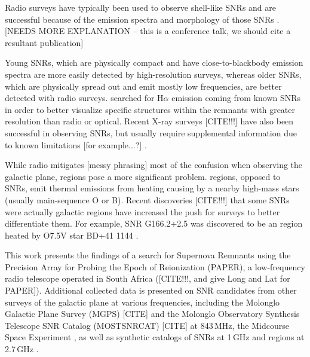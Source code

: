 \documentclass[preprint2,epsf,epsfig,graphics]{emulateapj}
\begin{document}
Radio surveys have typically been used to observe shell-like SNRs and are successful because of the emission spectra and morphology of those SNRs \citep{Bandiera.01}.  {\color{red}[NEEDS MORE EXPLANATION -- this is a conference talk, we should cite a resultant publication]}

Young SNRs, which are physically compact and have close-to-blackbody emission spectra are more easily detected by high-resolution surveys, whereas older SNRs, which are physically spread out and emit mostly low frequencies, are better detected with radio surveys. \cite{Stupar_cat.11} searched for H$\alpha$ emission coming from known SNRs in order to better visualize specific structures within the remnants with greater resolution than radio or optical.  Recent X-ray surveys {\color{red}[CITE!!!]} have also been successful in observing SNRs, but usually require supplemental information due to known limitations {\color{red}[for example...?]} \citep{Bandiera.01}. 

While radio mitigates {\color{red}[messy phrasing]} most of the confusion when observing the galactic plane,  regions pose a more significant problem.   regions, opposed to SNRs, emit thermal emissions from heating causing by a nearby high-mass stars (usually main-sequence O or B).  Recent discoveries {\color{red}[CITE!!!]} that some SNRs were actually galactic  regions have increased the push for surveys to better differentiate them.  For example, SNR G166.2+2.5 was discovered to be an  region heated by O7.5V star BD+41 1144 \citep{Foster.06}.  %

This work presents the findings of a search for Supernova Remnants using the Precision Array for Probing the Epoch of Reionization (PAPER), a low-frequency radio telescope operated in South Africa ({\color{red}[CITE!!!, and give Long and Lat for PAPER]}).
Additional collected data is presented on SNR candidates from other surveys of the galactic plane at various frequencies, including the Molonglo Galactic Plane Survey (MGPS) [CITE] and the Molonglo Observatory Synthesis Telescope SNR Catalog (MOSTSNRCAT) [CITE] at 843\,MHz, the Midcourse Space Experiment \citep[MSX][operating at 8.28--21.3\,$\mu$m (36.23--14.08\,THz)]{Egan.03}, as well as synthetic catalogs of SNRs at 1\,GHz \citep{DAGreen.14} and  regions at 2.7\,GHz \citep{Paladini.03}. 
\end{document}
